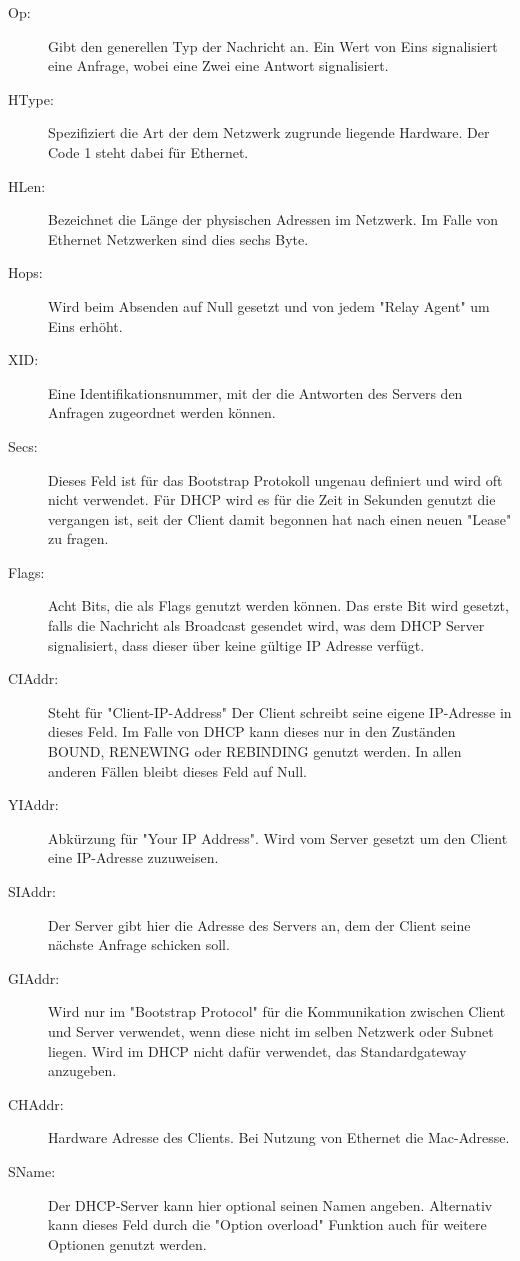 \begin{description}

\item[Op: ] Gibt den generellen Typ der Nachricht an. Ein Wert von Eins signalisiert eine Anfrage, wobei eine Zwei eine Antwort signalisiert.
\item[HType: ] Spezifiziert die Art der dem Netzwerk zugrunde liegende Hardware. Der Code 1 steht dabei für Ethernet. 
\item[HLen: ] Bezeichnet die Länge der physischen Adressen im Netzwerk. Im Falle von Ethernet Netzwerken sind dies sechs Byte. 
\item[Hops: ] Wird beim Absenden auf Null gesetzt und von jedem {}"Relay Agent"{} um Eins erhöht. 
\item[XID: ] Eine Identifikationsnummer, mit der die Antworten des Servers den Anfragen zugeordnet werden können.
\item[Secs: ] Dieses Feld ist für das Bootstrap Protokoll ungenau definiert und wird oft nicht verwendet. Für DHCP wird es für die Zeit in Sekunden genutzt die vergangen ist, seit der Client damit begonnen hat nach einen neuen {}"Lease"{} zu fragen. 
\item[Flags: ] Acht Bits, die als Flags genutzt werden können. Das erste Bit wird gesetzt, falls die Nachricht als Broadcast gesendet wird, was dem DHCP Server signalisiert, dass dieser über keine gültige IP Adresse verfügt.
\item[CIAddr: ] Steht für "{}Client-IP-Address"{} Der Client schreibt seine eigene IP-Adresse in dieses Feld. Im Falle von DHCP kann dieses nur in den Zuständen BOUND, RENEWING oder REBINDING genutzt werden. In allen anderen Fällen bleibt dieses Feld auf Null.
\item[YIAddr: ] Abkürzung für "Your IP Address". Wird vom Server gesetzt um den Client eine IP-Adresse zuzuweisen. 
\item[SIAddr: ] Der Server gibt hier die Adresse des Servers an, dem der Client seine nächste Anfrage schicken soll. 
\item[GIAddr: ] Wird nur im {}"Bootstrap Protocol"{} für die Kommunikation zwischen Client und Server verwendet, wenn diese nicht im selben Netzwerk oder Subnet liegen. Wird im DHCP nicht dafür verwendet, das Standardgateway anzugeben. 
\item[CHAddr: ] Hardware Adresse des Clients. Bei Nutzung von Ethernet die Mac-Adresse. 
\item[SName: ] Der DHCP-Server kann hier optional seinen Namen angeben. Alternativ kann dieses Feld durch die "{}Option overload"{} Funktion auch für weitere Optionen genutzt werden.

\end{description}
